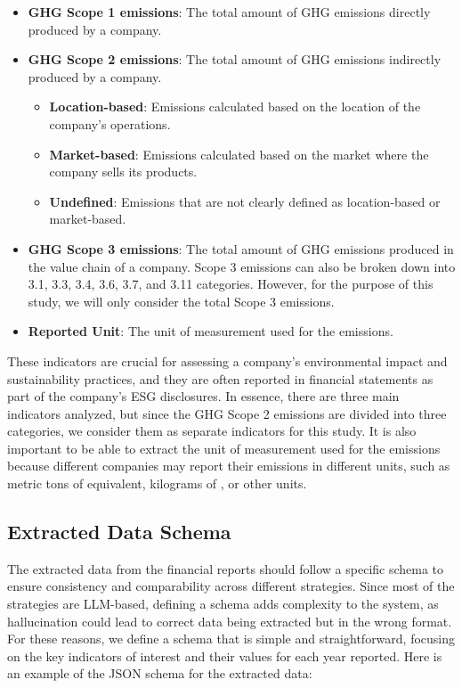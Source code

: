\documentclass[english, 12pt, a4paper, elec, utf8, a-2b, online]{aaltothesis}
\begin{document}
\begin{itemize}
    \item \textbf{\ac{GHG} Scope 1 emissions}: The total amount of \ac{GHG} emissions directly produced by a company.
    \item \textbf{\ac{GHG} Scope 2 emissions}: The total amount of \ac{GHG} emissions indirectly produced by a company.
            \begin{itemize}
                \item \textbf{Location-based}: Emissions calculated based on the location of the company's operations.
                \item \textbf{Market-based}: Emissions calculated based on the market where the company sells its products.
                \item \textbf{Undefined}: Emissions that are not clearly defined as location-based or market-based.
            \end{itemize}
    \item \textbf{\ac{GHG} Scope 3 emissions}: The total amount of \ac{GHG} emissions produced in the value chain of a company.
    Scope 3 emissions can also be broken down into 3.1, 3.3, 3.4, 3.6, 3.7, and 3.11 categories.
    However, for the purpose of this study, we will only consider the total Scope 3 emissions.
    \item \textbf{Reported Unit}: The unit of measurement used for the emissions.
\end{itemize}

These indicators are crucial for assessing a company's environmental impact and sustainability practices, and they are often reported in financial statements as part of the company's \ac{ESG} disclosures.
In essence, there are three main indicators analyzed, but since the \ac{GHG} Scope 2 emissions are divided into three categories, we consider them as separate indicators for this study.
It is also important to be able to extract the unit of measurement used for the emissions because different companies may report their emissions in different units, such as metric tons of  equivalent, kilograms of , or other units.

\subsection{Extracted Data Schema}

The extracted data from the financial reports should follow a specific schema to ensure consistency and comparability across different strategies.
Since most of the strategies are \ac{LLM}-based, defining a schema adds complexity to the system, as hallucination could lead to correct data being extracted but in the wrong format.
For these reasons, we define a schema that is simple and straightforward, focusing on the key indicators of interest and their values for each year reported.
Here is an example of the \ac{JSON} schema for the extracted data:
\end{document}
